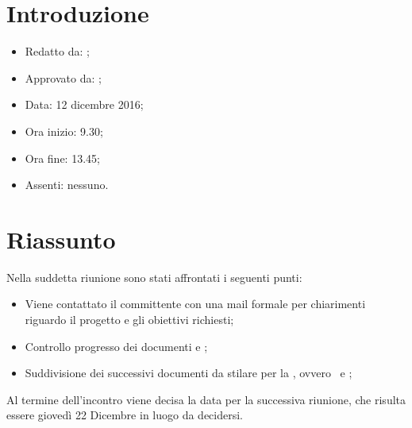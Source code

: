 \section{Introduzione}

	\begin{itemize}
		\item Redatto da: \DS;
		\item Approvato da: \NS;
		\item Data: 12 dicembre 2016;
		\item Ora inizio: 9.30;
		\item Ora fine: 13.45;
		\item Assenti: nessuno.	
	\end{itemize}

\section{Riassunto}
Nella suddetta riunione sono stati affrontati i seguenti punti:
\begin{itemize}
	\item Viene contattato il committente con una mail formale per chiarimenti riguardo il progetto e gli obiettivi richiesti;
	\item Controllo progresso dei documenti \NdP e \AdR;
	\item Suddivisione dei successivi documenti da stilare per la \RR, ovvero \PdP\ e \PdQ;
\end{itemize}
Al termine dell'incontro viene decisa la data per la successiva riunione, che risulta essere giovedì 22 Dicembre in luogo da decidersi.